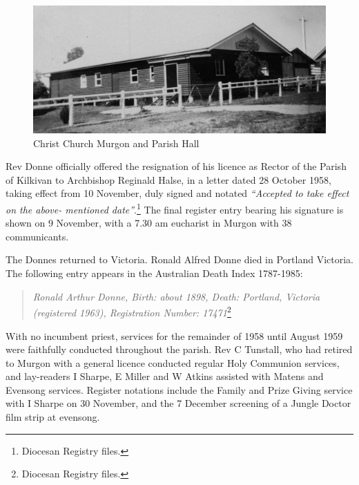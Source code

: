 \begin{figure}[!htb]
\begin{center}
\includegraphics[width=1.\textwidth,center]{../images/churchHallEarly.jpg}
\caption{Christ Church Murgon and Parish Hall}
\end{center}
\end{figure}




Rev Donne officially offered the resignation of his licence as Rector of the Parish of Kilkivan to Archbishop Reginald Halse, in a letter dated 28 October 1958, taking effect from 10 November, duly signed and notated \emph{``Accepted to take effect on the above- mentioned date''}.\footnote{Diocesan Registry files.} The final register entry bearing his signature is shown on 9 November, with a 7.30 am eucharist in Murgon with 38 communicants.


The Donnes returned to Victoria. Ronald Alfred Donne died in Portland Victoria. The following entry appears in the Australian Death Index 1787-1985:



\begin{quote}

\emph{Ronald Arthur Donne, Birth: about 1898, Death: Portland, Victoria (registered 1963), Registration Number: 17471}\footnote{Diocesan Registry files.}
\end{quote}



With no incumbent priest, services for the remainder of 1958 until August 1959 were faithfully conducted throughout the parish. Rev C Tunstall, who had retired to Murgon with a general licence conducted regular Holy Communion services, and lay-readers I Sharpe, E Miller and W Atkins assisted with Matens and Evensong services. Register notations include the Family and Prize Giving service with I Sharpe on 30 November, and the 7 December screening of a Jungle Doctor film strip at evensong.



